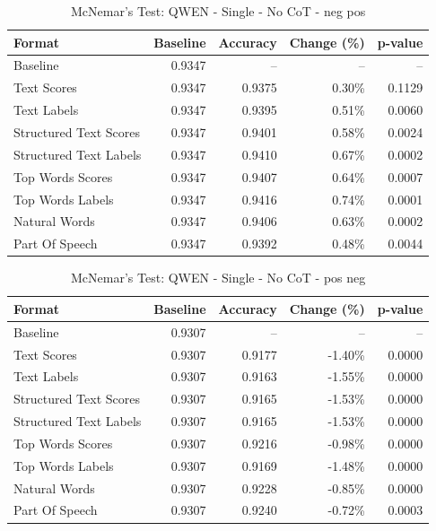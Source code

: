 \begin{table}[htbp]
\centering
\caption{McNemar's Test: QWEN - Single - No CoT - neg pos}
\label{tab:qwen-single-no_chain_of_thought-neg_pos}
\begin{tabular}{lrrrr}
\toprule
Format & Baseline & Accuracy & Change (\%) & p-value \\
\midrule
Baseline & 0.9347 & -- & -- & -- \\
Text Scores & 0.9347 & 0.9375 & 0.30\% & 0.1129 \\
Text Labels & 0.9347 & 0.9395 & 0.51\% & 0.0060 \\
Structured Text Scores & 0.9347 & 0.9401 & 0.58\% & 0.0024 \\
Structured Text Labels & 0.9347 & 0.9410 & 0.67\% & 0.0002 \\
Top Words Scores & 0.9347 & 0.9407 & 0.64\% & 0.0007 \\
Top Words Labels & 0.9347 & 0.9416 & 0.74\% & 0.0001 \\
Natural Words & 0.9347 & 0.9406 & 0.63\% & 0.0002 \\
Part Of Speech & 0.9347 & 0.9392 & 0.48\% & 0.0044 \\
\bottomrule
\end{tabular}
\end{table}

\begin{table}[htbp]
\centering
\caption{McNemar's Test: QWEN - Single - No CoT - pos neg}
\label{tab:qwen-single-no_chain_of_thought-pos_neg}
\begin{tabular}{lrrrr}
\toprule
Format & Baseline & Accuracy & Change (\%) & p-value \\
\midrule
Baseline & 0.9307 & -- & -- & -- \\
Text Scores & 0.9307 & 0.9177 & -1.40\% & 0.0000 \\
Text Labels & 0.9307 & 0.9163 & -1.55\% & 0.0000 \\
Structured Text Scores & 0.9307 & 0.9165 & -1.53\% & 0.0000 \\
Structured Text Labels & 0.9307 & 0.9165 & -1.53\% & 0.0000 \\
Top Words Scores & 0.9307 & 0.9216 & -0.98\% & 0.0000 \\
Top Words Labels & 0.9307 & 0.9169 & -1.48\% & 0.0000 \\
Natural Words & 0.9307 & 0.9228 & -0.85\% & 0.0000 \\
Part Of Speech & 0.9307 & 0.9240 & -0.72\% & 0.0003 \\
\bottomrule
\end{tabular}
\end{table}


